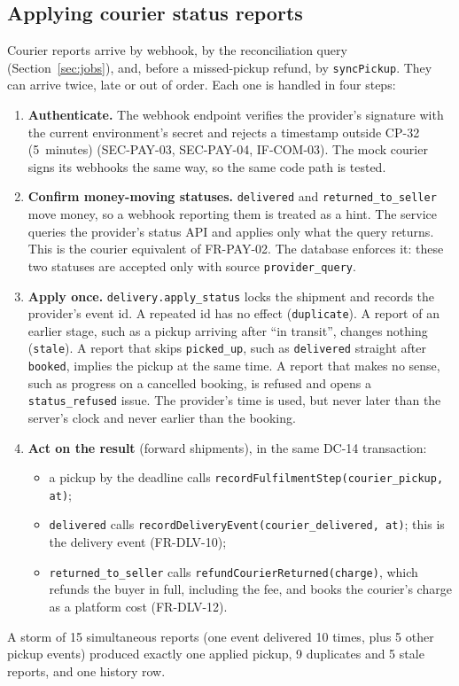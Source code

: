 \documentclass[11pt,a4paper]{article}
\begin{document}
\subsection{Applying courier status reports}
\label{sec:status}
Courier reports arrive by webhook, by the reconciliation query (Section~\ref{sec:jobs}), and, before a missed-pickup refund, by \texttt{syncPickup}. They can arrive twice, late or out of order. Each one is handled in four steps:
\begin{enumerate}[nosep]
  \item \textbf{Authenticate.} The webhook endpoint verifies the provider's signature with the current environment's secret and rejects a timestamp outside CP-32 (5~minutes) (SEC-PAY-03, SEC-PAY-04, IF-COM-03). The mock courier signs its webhooks the same way, so the same code path is tested.
  \item \textbf{Confirm money-moving statuses.} \texttt{delivered} and \texttt{returned\_to\_seller} move money, so a webhook reporting them is treated as a hint. The service queries the provider's status API and applies only what the query returns. This is the courier equivalent of FR-PAY-02. The database enforces it: these two statuses are accepted only with source \texttt{provider\_query}.
  \item \textbf{Apply once.} \texttt{delivery.apply\_status} locks the shipment and records the provider's event id. A repeated id has no effect (\texttt{duplicate}). A report of an earlier stage, such as a pickup arriving after ``in transit'', changes nothing (\texttt{stale}). A report that skips \texttt{picked\_up}, such as \texttt{delivered} straight after \texttt{booked}, implies the pickup at the same time. A report that makes no sense, such as progress on a cancelled booking, is refused and opens a \texttt{status\_refused} issue. The provider's time is used, but never later than the server's clock and never earlier than the booking.
  \item \textbf{Act on the result} (forward shipments), in the same DC-14 transaction:
  \begin{itemize}[nosep]
    \item a pickup by the deadline calls \texttt{recordFulfilmentStep(courier\_pickup, at)};
    \item \texttt{delivered} calls \texttt{recordDeliveryEvent(courier\_delivered, at)}; this is the delivery event (FR-DLV-10);
    \item \texttt{returned\_to\_seller} calls \texttt{refundCourierReturned(charge)}, which refunds the buyer in full, including the fee, and books the courier's charge as a platform cost (FR-DLV-12).
  \end{itemize}
\end{enumerate}
A storm of 15 simultaneous reports (one event delivered 10 times, plus 5 other pickup events) produced exactly one applied pickup, 9 duplicates and 5 stale reports, and one history row.
\end{document}
